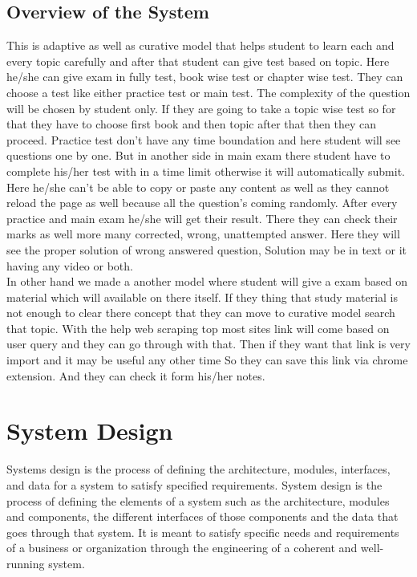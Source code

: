 \section{Overview of the System}
This is adaptive as well as curative model that helps student to learn each and every topic carefully and after that student can give test based on topic. Here he/she can give exam in fully test, book wise test or chapter wise test. They can choose a test like either practice test or main test. The complexity of the question will be chosen by student only. If they are going to take a topic wise test so for that they have to choose first book and then topic after that then they can proceed. Practice test don’t have any time boundation and here student will see questions one by one. But in another side in main exam there student have to complete his/her test with in a time limit otherwise it will automatically submit. Here he/she can’t be able to copy or paste any content as well as they cannot reload the page as well because all the question’s coming randomly. After every practice and main exam he/she will get their result. There they can check their marks as well more many corrected, wrong, unattempted answer. Here they will see the proper solution of wrong answered question, Solution may be in text or it having any video or both.\\[0.5cm]

In other hand we made a another model where student will give a exam based on material which will available on there itself. If they thing that study material is not enough to clear there concept that they can move to curative model search that topic. With the help web scraping top most sites link will come based on user query and they can go through with that. Then if they want that link is very import and it may be useful any other time So they can save this link via chrome extension. And they can check it form his/her notes.

\chapter{System Design}
Systems design is the process of defining the architecture, modules, interfaces, and data for a system to satisfy specified requirements. System design is the process of defining the elements of a system such as the architecture, modules and components, the different interfaces of those components and the data that goes through that system. It is meant to satisfy specific needs and requirements of a business or organization through the engineering of a coherent and well-running system.\\


